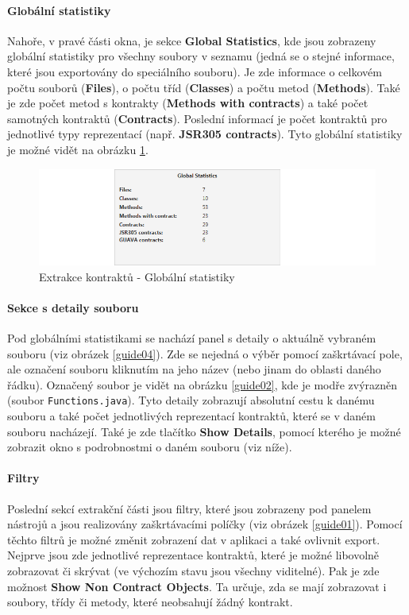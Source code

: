 				\paragraph{Globální statistiky}
					Nahoře, v pravé části okna, je sekce \textbf{Global Statistics}, kde jsou zobrazeny globální statistiky pro všechny soubory v seznamu (jedná se o stejné informace, které jsou exportovány do speciálního souboru). Je zde informace o celkovém počtu souborů (\textbf{Files}), o počtu tříd (\textbf{Classes}) a počtu metod (\textbf{Methods}). Také je zde počet metod s kontrakty (\textbf{Methods with contracts}) a také počet samotných kontraktů (\textbf{Contracts}). Poslední informací je počet kontraktů pro jednotlivé typy reprezentací (např. \textbf{JSR305 contracts}). Tyto globální statistiky je možné vidět na obrázku \ref{guide03}.
			
			\begin{figure}[!htb]
					\centering
					\includegraphics[width=1\textwidth]{img/guide03.png}
					\caption[guide03]{Extrakce kontraktů - Globální statistiky}
					\label{guide03}
				\endminipage\hfill
			\end{figure}
			
				\paragraph{Sekce s detaily souboru}
					Pod globálními statistikami se nachází panel s detaily o aktuálně vybraném souboru (viz obrázek \ref{guide04}). Zde se nejedná o výběr pomocí zaškrtávací pole, ale označení souboru kliknutím na jeho název (nebo jinam do oblasti daného řádku). Označený soubor je vidět na obrázku \ref{guide02}, kde je modře zvýrazněn (soubor \texttt{Functions.java}). Tyto detaily zobrazují absolutní cestu k danému souboru a také počet jednotlivých reprezentací kontraktů, které se v daném souboru nacházejí. Také je zde tlačítko \textbf{Show Details}, pomocí kterého je možné zobrazit okno s podrobnostmi o daném souboru (viz níže).\\
			
				\paragraph{Filtry}					
					Poslední sekcí extrakční části jsou filtry, které jsou zobrazeny pod panelem nástrojů a jsou realizovány zaškrtávacími políčky (viz obrázek \ref{guide01}). Pomocí těchto filtrů je možné změnit zobrazení dat v aplikaci a také ovlivnit export. Nejprve jsou zde jednotlivé reprezentace kontraktů, které je možné libovolně zobrazovat či skrývat (ve výchozím stavu jsou všechny viditelné). Pak je zde možnost \textbf{Show Non Contract Objects}. Ta určuje, zda se mají zobrazovat i soubory, třídy či metody, které neobsahují žádný kontrakt.\\
						
